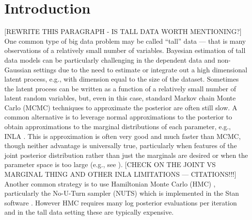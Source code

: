 \documentclass[12pt]{article}
\begin{document}
\clearpage\pagebreak\newpage {}
\baselineskip=24pt

\section{Introduction}

[REWRITE THIS PARAGRAPH - IS TALL DATA WORTH MENTIONING?]
One common type of big data problem may be called ``tall'' data --- that is many observations of a relatively small number of variables. Bayesian estimation of tall data models can be particularly challenging in the dependent data and non-Gaussian settings due to the need to estimate or integrate out a high dimensional latent process, e.g., with dimension equal to the size of the dataset. Sometimes the latent process can be written as a function of a relatively small number of latent random variables, but, even in this case, standard Markov chain Monte Carlo (MCMC) techniques to approximate the posterior are often still slow. A common alternative is to leverage normal approximations to the posterior to obtain approximations to the marginal distributions of each parameter, e.g., INLA \citep{rue2009approximate}. This is approximation is often very good and much faster than MCMC, though neither advantage is universally true, particularly when features of the joint posterior distribution rather than just the marginals are desired or when the parameter space is too large (e.g., see \citet{taylor2014inla}). [CHECK ON THE JOINT VS MARGINAL THING AND OTHER INLA LIMITATIONS --- CITATIONS!!!] Another common strategy is to use Hamiltonian Monte Carlo (HMC) \citep{neal2011mcmc}, particularly the No-U-Turn sampler (NUTS) \citep{homan2014no} which is implemented in the Stan software \citep{carpenter2015stan}. However HMC requires many log posterior evaluations per iteration and in the tall data setting these are typically expensive.
\end{document}
